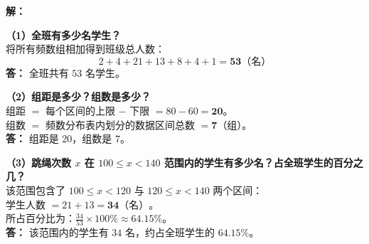 \vspace{0.4cm}
\begin{center}
\renewcommand{\arraystretch}{1.6}
\end{center}

\vspace{0.4cm}

\textbf{解：}

\textbf{（1）全班有多少名学生？} \\
将所有频数组相加得到班级总人数：
$$2 + 4 + 21 + 13 + 8 + 4 + 1 = \boldsymbol{53}\text{（名）}$$
\textbf{答：} 全班共有 $53$ 名学生。

\vspace{0.4cm}

\textbf{（2）组距是多少？组数是多少？} \\
组距 $=$ 每个区间的上限 $-$ 下限 $= 80 - 60 = \boldsymbol{20}$。\\
组数 $=$ 频数分布表内划分的数据区间总数 $= \boldsymbol{7}$（组）。\\
\textbf{答：} 组距是 $20$，组数是 $7$。

\vspace{0.4cm}

\textbf{（3）跳绳次数 $x$ 在 $100 \leqslant x < 140$ 范围内的学生有多少名？占全班学生的百分之几？} \\
该范围包含了 $100 \leqslant x < 120$ 与 $120 \leqslant x < 140$ 两个区间：\\
学生人数 $= 21 + 13 = \boldsymbol{34}\text{（名）}$。\\
所占百分比为：$\frac{34}{53} \times 100\% \approx \boldsymbol{64.15\%}$。\\
\textbf{答：} 该范围内的学生有 $34$ 名，约占全班学生的 $64.15\%$。

